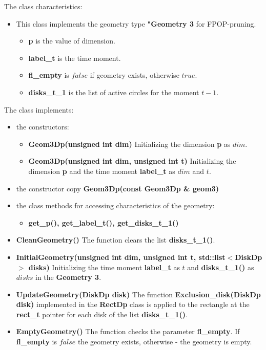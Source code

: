 \documentclass{report}
\begin{document}
	The class characteristics: 
	\begin{itemize}
		\item This class implements the geometry type {\bfseries "Geometry 3} for FPOP-pruning. 
		\begin{itemize}
			\item {\bfseries p} is the value of dimension.
			\item {\bfseries label\_t} is the time moment.
			\item {\bfseries fl\_empty} is $false$ if geometry exists, otherwise $true$.
			\item {\bfseries disks\_t\_1} is the list of active circles for the moment $t-1$.
		\end{itemize}
	\end{itemize}

	The class implements:
	\begin{itemize}	
		\item the constructors:
		\begin{itemize}
			\item {\bfseries Geom3Dp(unsigned  int dim)} 
			Initializing the dimension {\bfseries p} as $dim$.
			\item {\bfseries Geom3Dp(unsigned int dim, unsigned int t)} 
			Initializing the dimension {\bfseries p} and the time moment {\bfseries label\_t} as $dim$ and $t$.
		\end{itemize}
		\item the constructor copy {\bfseries Geom3Dp(const Geom3Dp \& geom3)} 
		\item the class methods for accessing characteristics of the geometry:
		\begin{itemize}
			\item {\bfseries get\_p(), get\_label\_t(), get\_disks\_t\_1()}		
		\end{itemize}
		\item{\bfseries CleanGeometry()}
		The function clears the list {\bfseries disks\_t\_1()}.
		\item{\bfseries InitialGeometry(unsigned int dim, unsigned int t, std::list$<$DiskDp$>$ disks)}
		Initializing the time moment {\bfseries label\_t} as $t$ and {\bfseries disks\_t\_1()} as $disks$ in the {\bfseries Geometry 3}. 
		\item {\bfseries UpdateGeometry(DiskDp disk)} 
		The function {\bfseries Exclusion\_disk(DiskDp disk)} implemented in the {\bfseries RectDp} class is applied to the rectangle at the {\bfseries rect\_t} pointer for each disk of the list {\bfseries disks\_t\_1()}.
		\item {\bfseries EmptyGeometry()}
		The function checks the parameter {\bfseries fl\_empty}. If {\bfseries fl\_empty} is $false$ the  geometry exists, otherwise - the geometry is empty.	
	\end{itemize}
\end{document}
